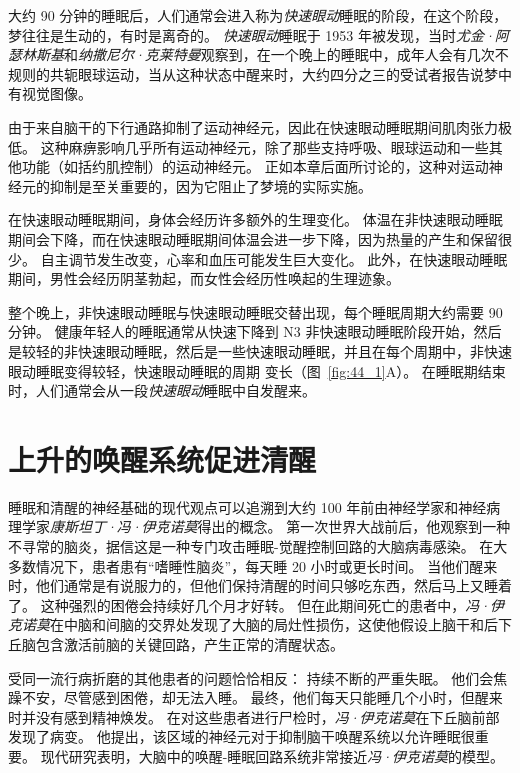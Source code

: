 大约 90 分钟的睡眠后，人们通常会进入称为\textit{快速眼动}睡眠的阶段，在这个阶段，梦往往是生动的，有时是离奇的。
\textit{快速眼动}睡眠于 1953 年被发现，当时\textit{尤金·阿瑟林斯基}和\textit{纳撒尼尔·克莱特曼}观察到，在一个晚上的睡眠中，成年人会有几次不规则的共轭眼球运动，当从这种状态中醒来时，大约四分之三的受试者报告说梦中有视觉图像。


由于来自脑干的下行通路抑制了运动神经元，因此在快速眼动睡眠期间肌肉张力极低。
这种麻痹影响几乎所有运动神经元，除了那些支持呼吸、眼球运动和一些其他功能（如括约肌控制）的运动神经元。
正如本章后面所讨论的，这种对运动神经元的抑制是至关重要的，因为它阻止了梦境的实际实施。


在快速眼动睡眠期间，身体会经历许多额外的生理变化。
体温在非快速眼动睡眠期间会下降，而在快速眼动睡眠期间体温会进一步下降，因为热量的产生和保留很少。
自主调节发生改变，心率和血压可能发生巨大变化。
此外，在快速眼动睡眠期间，男性会经历阴茎勃起，而女性会经历性唤起的生理迹象。


整个晚上，非快速眼动睡眠与快速眼动睡眠交替出现，每个睡眠周期大约需要 90 分钟。
健康年轻人的睡眠通常从快速下降到 N3 非快速眼动睡眠阶段开始，然后是较轻的非快速眼动睡眠，然后是一些快速眼动睡眠，并且在每个周期中，非快速眼动睡眠变得较轻，快速眼动睡眠的周期 变长（图~\ref{fig:44_1}A）。
在睡眠期结束时，人们通常会从一段\textit{快速眼动}睡眠中自发醒来。



\section{上升的唤醒系统促进清醒}

睡眠和清醒的神经基础的现代观点可以追溯到大约 100 年前由神经学家和神经病理学家\textit{康斯坦丁·冯·伊克诺莫}得出的概念。
第一次世界大战前后，他观察到一种不寻常的脑炎，据信这是一种专门攻击睡眠-觉醒控制回路的大脑病毒感染。
在大多数情况下，患者患有“嗜睡性脑炎”，每天睡 20 小时或更长时间。
当他们醒来时，他们通常是有说服力的，但他们保持清醒的时间只够吃东西，然后马上又睡着了。
这种强烈的困倦会持续好几个月才好转。
但在此期间死亡的患者中，\textit{冯·伊克诺莫}在中脑和间脑的交界处发现了大脑的局灶性损伤，这使他假设上脑干和后下丘脑包含激活前脑的关键回路，产生正常的清醒状态。


受同一流行病折磨的其他患者的问题恰恰相反：
持续不断的严重失眠。
他们会焦躁不安，尽管感到困倦，却无法入睡。
最终，他们每天只能睡几个小时，但醒来时并没有感到精神焕发。
在对这些患者进行尸检时，\textit{冯·伊克诺莫}在下丘脑前部发现了病变。
他提出，该区域的神经元对于抑制脑干唤醒系统以允许睡眠很重要。
现代研究表明，大脑中的唤醒-睡眠回路系统非常接近\textit{冯·伊克诺莫}的模型。



